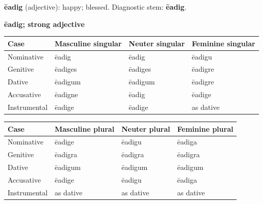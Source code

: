 \textbf{ēadig} (adjective): happy; blessed. Diagnostic stem: \textbf{ēadig}.

\textbf{ēadig; strong adjective}

\par\begingroup
\fontsize{10.5}{13.2}\selectfont
\setlength{\LTleft}{0pt}\setlength{\LTright}{\fill}
\noindent
\begin{tabular}{@{}>{\raggedright\arraybackslash}p{22.0mm}>{\raggedright\arraybackslash}p{31.188mm}>{\raggedright\arraybackslash}p{31.188mm}>{\raggedright\arraybackslash}p{31.188mm}@{}}
\toprule
\textbf{Case} & \textbf{Masculine singular} & \textbf{Neuter singular} & \textbf{Feminine singular} \\
\midrule
Nominative & ēadig & ēadig & ēadigu \\
Genitive & ēadiges & ēadiges & ēadigre \\
Dative & ēadigum & ēadigum & ēadigre \\
Accusative & ēadigne & ēadig & ēadige \\
Instrumental & ēadige & ēadige & as dative \\
\bottomrule
\end{tabular}
\par\endgroup
\par\addvspace{5pt}
\par\begingroup
\fontsize{10.5}{13.2}\selectfont
\setlength{\LTleft}{0pt}\setlength{\LTright}{\fill}
\noindent
\begin{tabular}{@{}>{\raggedright\arraybackslash}p{22.0mm}>{\raggedright\arraybackslash}p{31.188mm}>{\raggedright\arraybackslash}p{31.188mm}>{\raggedright\arraybackslash}p{31.188mm}@{}}
\toprule
\textbf{Case} & \textbf{Masculine plural} & \textbf{Neuter plural} & \textbf{Feminine plural} \\
\midrule
Nominative & ēadige & ēadigu & ēadiga \\
Genitive & ēadigra & ēadigra & ēadigra \\
Dative & ēadigum & ēadigum & ēadigum \\
Accusative & ēadige & ēadigu & ēadiga \\
Instrumental & as dative & as dative & as dative \\
\bottomrule
\end{tabular}
\par\endgroup

